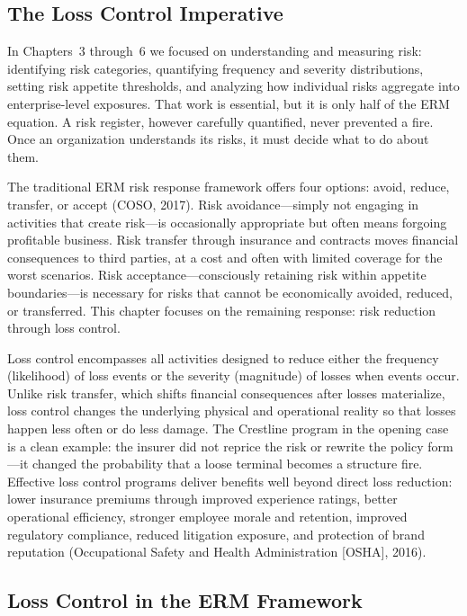 \documentclass[11pt,openany]{book}
\begin{document}
\subsection{The Loss Control Imperative}

In Chapters~3 through~6 we focused on understanding and measuring risk:
identifying risk categories, quantifying frequency and severity distributions,
setting risk appetite thresholds, and analyzing how individual risks aggregate
into enterprise-level exposures. That work is essential, but it is only half
of the ERM equation. A risk register, however carefully quantified, never
prevented a fire. Once an organization understands its risks, it must decide
what to do about them.

The traditional ERM risk response framework offers four options: avoid,
reduce, transfer, or accept (COSO, 2017). Risk avoidance---simply not engaging
in activities that create risk---is occasionally appropriate but often means
forgoing profitable business. Risk transfer through insurance and contracts
moves financial consequences to third parties, at a cost and often with
limited coverage for the worst scenarios. Risk acceptance---consciously
retaining risk within appetite boundaries---is necessary for risks that cannot
be economically avoided, reduced, or transferred. This chapter focuses on the
remaining response: risk reduction through loss control.

Loss control encompasses all activities designed to reduce either the
frequency (likelihood) of loss events or the severity (magnitude) of losses
when events occur. Unlike risk transfer, which shifts financial consequences
after losses materialize, loss control changes the underlying physical and
operational reality so that losses happen less often or do less damage. The
Crestline program in the opening case is a clean example: the insurer did not
reprice the risk or rewrite the policy form---it changed the probability that
a loose terminal becomes a structure fire. Effective loss control programs
deliver benefits well beyond direct loss reduction: lower insurance premiums
through improved experience ratings, better operational efficiency, stronger
employee morale and retention, improved regulatory compliance, reduced
litigation exposure, and protection of brand reputation (Occupational Safety
and Health Administration [OSHA], 2016).

\subsection{Loss Control in the ERM Framework}
\end{document}
